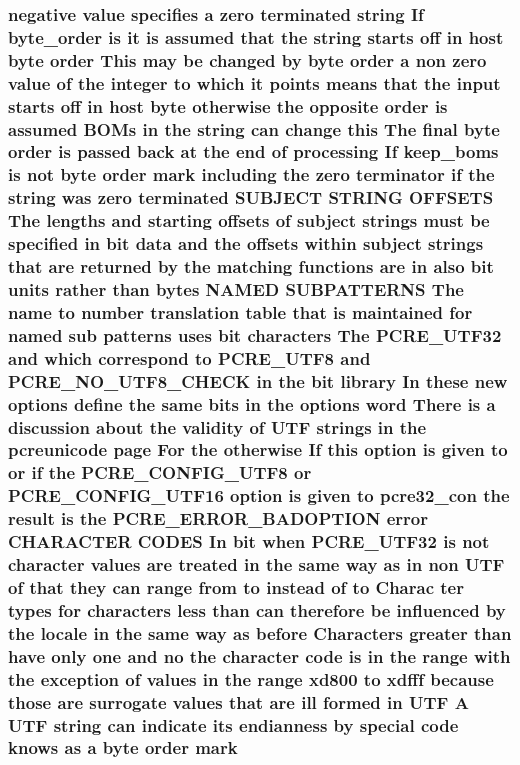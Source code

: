 \subsubsection[{\texorpdfstring{mark}{mark}}]{ negative {\bf value} specifies {\bf a} {\bf zero} terminated {\bf string} If byte\+\_\+order {\bf is} {\bf it} {\bf is} assumed that the {\bf string} starts off {\bf in} {\bf host} byte {\bf order} This may {\bf be} changed by byte {\bf order} {\bf a} non {\bf zero} {\bf value} {\bf of} the integer {\bf to} {\bf which} {\bf it} points means that the {\bf input} starts off {\bf in} {\bf host} byte otherwise the opposite {\bf order} {\bf is} assumed B\+O\+Ms {\bf in} the {\bf string} {\bf can} change {\bf this} The final byte {\bf order} {\bf is} passed back at the {\bf end} {\bf of} processing If keep\+\_\+boms {\bf is} {\bf not} byte {\bf order} mark including the {\bf zero} terminator {\bf if} the {\bf string} was {\bf zero} terminated S\+U\+B\+J\+E\+CT {\bf S\+T\+R\+I\+NG} O\+F\+F\+S\+E\+TS The lengths and starting {\bf offsets} {\bf of} subject {\bf strings} must {\bf be} {\bf specified} {\bf in} {\bf bit} {\bf data} and the {\bf offsets} within subject {\bf strings} that {\bf are} returned by the {\bf matching} {\bf functions} {\bf are} {\bf in} also {\bf bit} {\bf units} rather {\bf than} {\bf bytes} N\+A\+M\+ED S\+U\+B\+P\+A\+T\+T\+E\+R\+NS The {\bf name} {\bf to} {\bf number} translation {\bf table} that {\bf is} maintained for named sub {\bf patterns} uses {\bf bit} {\bf characters} The {\bf P\+C\+R\+E\+\_\+\+U\+T\+F32} and {\bf which} correspond {\bf to} {\bf P\+C\+R\+E\+\_\+\+U\+T\+F8} and {\bf P\+C\+R\+E\+\_\+\+N\+O\+\_\+\+U\+T\+F8\+\_\+\+C\+H\+E\+CK} {\bf in} the {\bf bit} {\bf library} In these new {\bf options} define the same bits {\bf in} the {\bf options} {\bf word} There {\bf is} {\bf a} discussion about the validity {\bf of} U\+TF {\bf strings} {\bf in} the pcreunicode page For the otherwise If {\bf this} {\bf option} {\bf is} {\bf given} {\bf to} {\bf or} {\bf if} the {\bf P\+C\+R\+E\+\_\+\+C\+O\+N\+F\+I\+G\+\_\+\+U\+T\+F8} {\bf or} {\bf P\+C\+R\+E\+\_\+\+C\+O\+N\+F\+I\+G\+\_\+\+U\+T\+F16} {\bf option} {\bf is} {\bf given} {\bf to} pcre32\+\_\+con the {\bf result} {\bf is} the {\bf P\+C\+R\+E\+\_\+\+E\+R\+R\+O\+R\+\_\+\+B\+A\+D\+O\+P\+T\+I\+ON} {\bf error} C\+H\+A\+R\+A\+C\+T\+ER C\+O\+D\+ES In {\bf bit} when {\bf P\+C\+R\+E\+\_\+\+U\+T\+F32} {\bf is} {\bf not} {\bf character} {\bf values} {\bf are} treated {\bf in} the same {\bf way} {\bf as} {\bf in} non U\+TF {\bf of} that they {\bf can} range {\bf from} {\bf to} instead {\bf of} {\bf to} Charac ter {\bf types} for {\bf characters} less {\bf than} {\bf can} {\bf therefore} {\bf be} influenced by the {\bf locale} {\bf in} the same {\bf way} {\bf as} before Characters greater {\bf than} have only one and no the {\bf character} {\bf code} {\bf is} {\bf in} the range {\bf with} the exception {\bf of} {\bf values} {\bf in} the range xd800 {\bf to} xdfff because those {\bf are} surrogate {\bf values} that {\bf are} ill formed {\bf in} U\+TF {\bf A} U\+TF {\bf string} {\bf can} indicate its endianness by {\bf special} {\bf code} knows {\bf as} {\bf a} byte {\bf order} mark}\hypertarget{pcretest_8txt_a89360b07e47b1dcef941ef8294dd9b5d}{}\label{pcretest_8txt_a89360b07e47b1dcef941ef8294dd9b5d}
